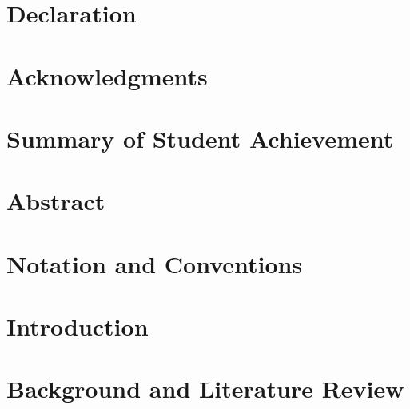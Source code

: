 \documentclass[12pt]{article}
\begin{document}

\clearpage
{}
\setcounter{page}{1}

\section*{Declaration}

\clearpage

\section*{Acknowledgments}

\clearpage

\section*{Summary of Student Achievement}

\clearpage

\justify

\section*{Abstract}

\clearpage

\listoffigures
\clearpage
\listoftables
\clearpage

\printacronyms[title=Acronyms]
\clearpage

\section*{Notation and Conventions}

\clearpage

\setcounter{tocdepth}{3}
\tableofcontents
\clearpage

\setcounter{page}{1}


\section{Introduction}
\label{sec:intro}


\section{Background and Literature Review}
\label{sec:background}

\end{document}
